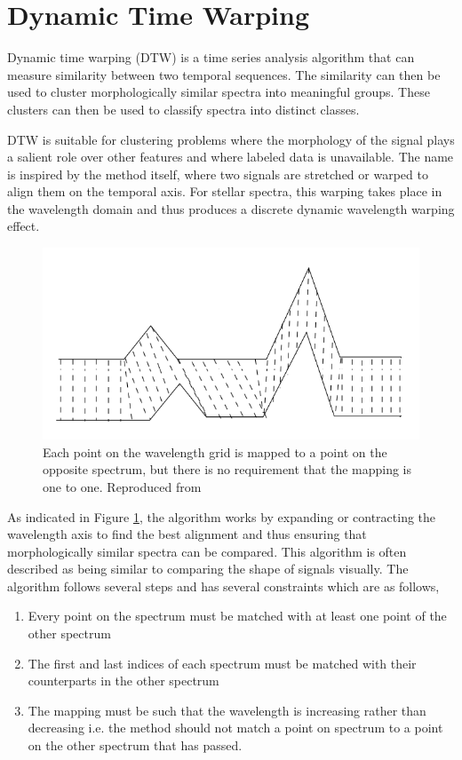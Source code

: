 \section{Dynamic Time Warping}

Dynamic time warping (DTW) is a time series analysis algorithm that can measure similarity between two temporal sequences. The similarity can then be used to cluster morphologically similar spectra into meaningful groups. These clusters can then be used to classify spectra into distinct classes. 

DTW is suitable for clustering problems where the morphology of the signal plays a salient role over other features \citep{nielsen2019practical} and where labeled data is unavailable. The name is inspired by the method itself, where two signals are stretched or warped to align them on the temporal axis. For stellar spectra, this warping takes place in the wavelength domain and thus produces a discrete dynamic wavelength warping effect.

\begin{figure}[!htb]
\centering
\includegraphics[scale=1]{figures/Dynamic_time_warping.png}
\caption{Each point on the wavelength grid is mapped to a point on the opposite spectrum, but there is no requirement that the mapping is one to one. Reproduced from \citet{nielsen2019practical}}
\label{fig4.1}
\end{figure}

As indicated in Figure \ref{fig4.1}, the algorithm works by expanding or contracting the wavelength axis to find the best alignment and thus ensuring that morphologically similar spectra can be compared. This algorithm is often described as being similar to comparing the shape of signals visually. The algorithm follows several steps and has several constraints which are as follows,

\begin{enumerate}
    \item Every point on the spectrum must be matched with at least one point of the other spectrum
    \item The first and last indices of each spectrum must be matched with their counterparts in the other spectrum
    \item The mapping must be such that the wavelength is increasing rather than decreasing i.e. the method should not match a point on spectrum to a point on the other spectrum that has passed. 
\end{enumerate}

